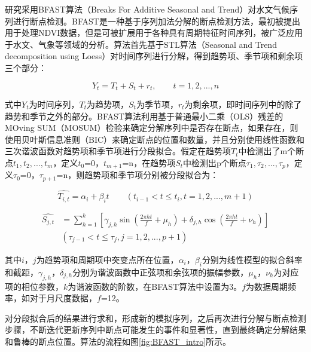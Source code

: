 研究采用BFAST算法（Breaks For Additive Seasonal and Trend）对水文气候序列进行断点检测。BFAST是一种基于序列加法分解的断点检测方法，最初被提出用于处理NDVI数据\cite{verbesseltDetectingTrendSeasonal2010,verbesseltPhenologicalChangeDetection2010}，但是可被扩展用于各种具有周期特征时间序列，被广泛应用于水文、气象等领域的分析\cite{liTrendSeasonalityAbrupt2022, jiangIdentifyingTrendShifts2022, bernardinoGlobalscaleCharacterizationTurning2020}。算法首先基于STL算法（Seasonal and Trend decomposition using Loess）对时间序列进行分解，得到趋势项、季节项和剩余项三个部分：

\begin{equation}
	Y_t = T_t + S_t + r_t, \qquad  t=1,2,...,n
\end{equation}

式中$Y_t$为时间序列，$T_t$为趋势项，$S_t$为季节项，$r_t$为剩余项，即时间序列中的除了趋势和季节之外的部分。BFAST算法利用基于普通最小二乘（OLS）残差的MOving SUM（MOSUM）检验来确定分解序列中是否存在断点，如果存在，则使用贝叶斯信息准则（BIC）来确定断点的位置和数量，并且分别使用线性函数和三次谐波函数对趋势项和季节项进行分段拟合。假定在趋势项$T_t$中检测出了m个断点$t_1, t_2, ..., t_m$，定义$t_0$=0，$t_{m+1}$=n，在趋势项$S_t$中检测出p个断点$\tau_1, \tau_2, ..., \tau_p$，定义$\tau_0$=0，$\tau_{p+1}$=n，则趋势项和季节项分别被分段拟合为：

\begin{equation}
	\widehat{T_{i,t}}  = \alpha_i + \beta_i t \qquad   \left(t_{i-1}<t\leq t_i, t=1,2,...,m+1 \right)
\end{equation}

\begin{equation}
\begin{aligned}
	\widehat{S_{j,t}}  & = \sum_{h=1}^{k} [\gamma_{j,h} \sin (\frac{2\pi ht}{f} + \mu_h) + \delta_{j,h} \cos (\frac{2\pi ht}{f} + \nu_h)] \\ &  \left(\tau_{j-1}<t\leq \tau_j, j=1,2,...,p+1 \right)
\end{aligned}
\end{equation}

其中$i$，$j$为趋势项和周期项中突变点所在位置，$\alpha_i$，$\beta_i$分别为线性模型的拟合斜率和截距，$\gamma_{j,h}$，$\delta_{j,h}$分别为谐波函数中正弦项和余弦项的振幅参数，$\mu_h$，$\nu_h$为对应项的相位参数，$k$为谐波函数的阶数，在BFAST算法中设置为3。$f$为数据周期频率，如对于月尺度数据，$f$=12。\par
对分段拟合后的结果进行求和，形成新的模拟序列，之后再次进行分解与断点检测步骤，不断迭代更新序列中断点可能发生的事件和显著性，直到最终确定分解结果和鲁棒的断点位置。算法的流程如图\ref{fig:BFAST_intro}所示。\par

